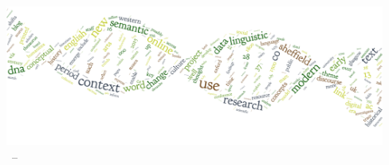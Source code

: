 \begin{titlepage}

\begin{addmargin}[0pt]{31pt}
\begin{center}
\Large
\hfill
\vfill
\begingroup
\color{Maroon}\spacedallcaps{\myTitle} \\ \bigskip %
\endgroup
\spacedlowsmallcaps{\myName}
\vfill
\includegraphics[width=12.5cm]{graphics/titlepage.png} \\
\vfill
\myTime\ -- \myVersion
\vfill
{\normalsize\doclicenseThis}
\end{center}
\end{addmargin}

\end{titlepage}